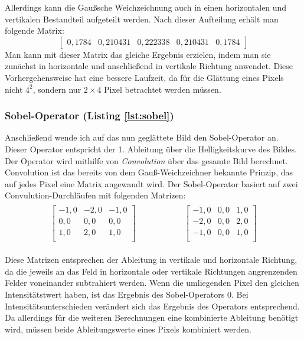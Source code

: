 Allerdings kann die Gaußsche Weichzeichnung auch in einen horizontalen und vertikalen Bestandteil aufgeteilt werden. Nach dieser Aufteilung erhält man folgende Matrix:
\begin{equation}
	\begin{bmatrix}
	0,1784&0,210431&0,222338&0,210431&0,1784
	\end{bmatrix}
\end{equation}
Man kann mit dieser Matrix das gleiche Ergebnis erzielen, indem man sie zunächst in horizontale und anschließend in vertikale Richtung anwendet. Diese Vorhergehensweise hat eine bessere Laufzeit, da für die Glättung eines Pixels nicht \(4^2\), sondern nur \(2\times 4\) Pixel betrachtet werden müssen.

\subsubsection{Sobel-Operator (Listing \ref{lst:sobel})}
Anschließend wende ich auf das nun geglättete Bild den Sobel-Operator an. Dieser Operator entspricht der 1. Ableitung über die Helligkeitskurve des Bildes. Der Operator wird mithilfe von \textit{Convolution} über das gesamte Bild berechnet. Convolution ist das bereits von dem Gauß-Weichzeichner bekannte Prinzip, das auf jedes Pixel eine Matrix angewandt wird. Der Sobel-Operator basiert auf zwei Convulution-Durchläufen mit folgenden Matrizen:
\begin{gather}
	\begin{split}
		\begin{bmatrix}
			-1,0&-2,0&-1,0\\
			0,0&0,0&0,0\\
			1,0&2,0&1,0\\
		\end{bmatrix}
	\end{split}
	\hspace{5em}
	\begin{split}
		\begin{bmatrix}
			-1,0&0,0&1,0\\
			-2,0&0,0&2,0\\
			-1,0&0,0&1,0\\
		\end{bmatrix}
	\end{split}
\end{gather}

Diese Matrizen entsprechen der Ableitung in vertikale und horizontale Richtung, da die jeweils an das Feld in horizontale oder vertikale Richtungen angrenzenden Felder voneinander subtrahiert werden.
Wenn die umliegenden Pixel den gleichen Intensitätstwert haben, ist das Ergebnis des Sobel-Operators 0.
Bei Intensitätsunterschieden verändert sich das Ergebnis des Operators entsprechend.
Da allerdings für die weiteren Berechnungen eine kombinierte Ableitung benötigt wird, müssen beide Ableitungswerte eines Pixels kombiniert werden.

